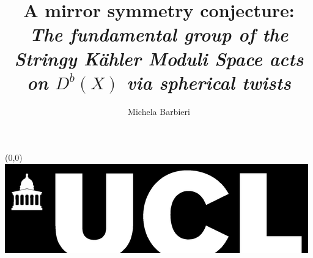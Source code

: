 \documentclass[a0]{a0poster}
\title{A mirror symmetry conjecture: \textit{The fundamental group of the \\ Stringy Kähler Moduli Space acts on $D^b(X)$ via spherical twists}}
\author{Michela Barbieri}
\begin{document}
\begin{textblock}{23}(0,0)
\vspace*{-48mm}\hspace*{-42mm}%
\includegraphics{ucl_bar_black.eps}
\begin{minipage}{1191mm}		%
\vspace{-20cm}
\maketitle
\end{minipage}
\end{textblock}

\end{document}
